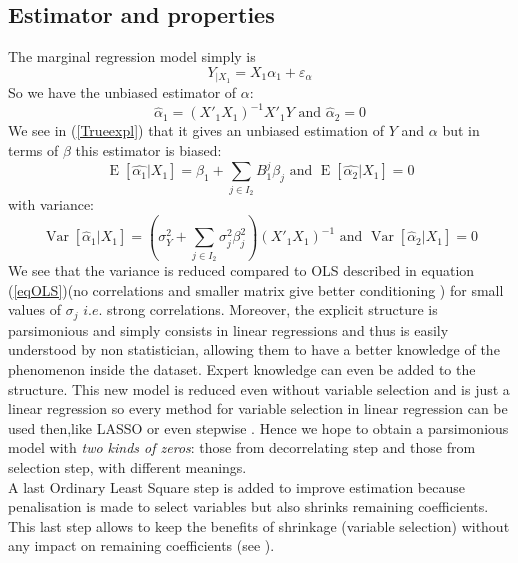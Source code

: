 \documentclass[11pt,a4paper]{article}
\begin{document}
\subsection{Estimator and properties}
	The marginal regression model simply is
	\begin{equation}
		Y_{|X_1}= X_1\alpha_1+ \varepsilon_{\alpha}
	\end{equation}			
		So we have the unbiased estimator of $\alpha$: 
		\begin{equation}
			\hat{\alpha}_{1} = (X'_{1} X_{1})^{-1}X'_{1}Y  \textrm{ and }\hat{\alpha}_{2} = 0
		\end{equation}
		We see in (\ref{Trueexpl}) that it gives an unbiased estimation of $Y$ and $\alpha$
		but in terms of $\beta$ this estimator is biased:
		\begin{equation}
			\operatorname{E}[\hat{\alpha_1}|X_1]=\beta_1+\sum_{j \in I_2}B^{j}_{1}\beta_{j}\textrm{ and }\operatorname{E}[\hat{\alpha_2}|X_1]=0
		\end{equation}
		with variance:
		\begin{equation}
			\operatorname{Var}[\hat{\alpha}_{1}|X_1]= (\sigma^2_Y+\sum_{j \in I_2}\sigma^2_{j}\beta_{j}^2 )(X'_{1} X_{1})^{-1}  \textrm{ and }\operatorname{Var}[\hat{\alpha}_{2}|X_1]= 0 
		\end{equation}
		We see that the variance is reduced compared to OLS described in equation (\ref{eqOLS})(no correlations and smaller matrix give better conditioning ) for small values of $\sigma_j$ $i.e.$ strong correlations.					
			Moreover, the explicit structure is parsimonious and simply consists in linear regressions and thus is easily understood by non statistician, allowing them to have a better knowledge of the phenomenon inside the dataset. Expert knowledge can even be added to the structure.
			 This new model is reduced even without variable selection and is just a linear regression so every method for variable selection in linear regression can be used then,like LASSO or even stepwise \cite{seber2012linear}. Hence we hope to obtain a parsimonious model with { \it two kinds of zeros}: those from decorrelating step and those from selection step, with different meanings.
			 \\
			  A last Ordinary Least Square step is added to improve estimation because penalisation is made to select variables but also shrinks remaining coefficients. This last step allows to keep the benefits of shrinkage (variable selection) without any impact on remaining coefficients (see \cite{SAM10088}).
		 
\end{document}
